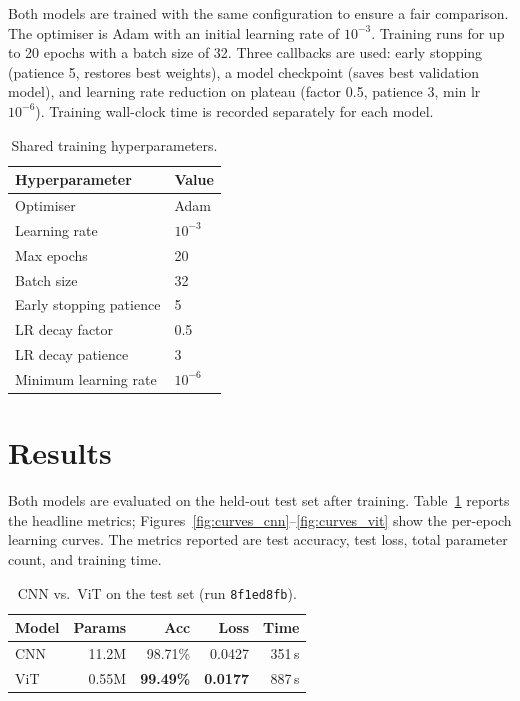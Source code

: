 Both models are trained with the same configuration to ensure a fair comparison.
The optimiser is Adam with an initial learning rate of $10^{-3}$. Training runs
for up to 20 epochs with a batch size of 32. Three callbacks are used: early
stopping (patience 5, restores best weights), a model checkpoint (saves best
validation model), and learning rate reduction on plateau (factor 0.5, patience
3, min lr $10^{-6}$). Training wall-clock time is recorded separately for each
model.
\begin{table}[H]
\centering
\caption{Shared training hyperparameters.}
\begin{tabular}{@{}ll@{}}
\toprule
\textbf{Hyperparameter}   & \textbf{Value} \\
\midrule
Optimiser                 & Adam \\
Learning rate             & $10^{-3}$ \\
Max epochs                & 20 \\
Batch size                & 32 \\
Early stopping patience   & 5 \\
LR decay factor           & 0.5 \\
LR decay patience         & 3 \\
Minimum learning rate     & $10^{-6}$ \\
\bottomrule
\end{tabular}
\end{table}
\section{Results}

Both models are evaluated on the held-out test set after training. Table~\ref{tab:results}
reports the headline metrics; Figures~\ref{fig:curves_cnn}--\ref{fig:curves_vit} show the
per-epoch learning curves. The metrics
reported are test accuracy, test loss, total parameter count, and training time.

\begin{table}[H]
\centering
\caption{CNN vs.\ ViT on the test set (run \texttt{8f1ed8fb}).}
\label{tab:results}
\begin{tabular}{@{}lrrrr@{}}
\toprule
\textbf{Model} & \textbf{Params} & \textbf{Acc} & \textbf{Loss} & \textbf{Time} \\
\midrule
CNN & 11.2M & 98.71\% & 0.0427 & 351\,s \\
ViT & 0.55M & \textbf{99.49\%} & \textbf{0.0177} & 887\,s \\
\bottomrule
\end{tabular}
\end{table}

